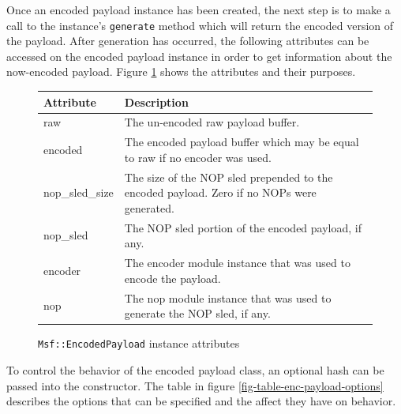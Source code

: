 \documentclass{report}
\begin{document}
\par
Once an encoded payload instance has been created, the next step is
to make a call to the instance's \texttt{generate} method which will
return the encoded version of the payload.  After generation has
occurred, the following attributes can be accessed on the encoded
payload instance in order to get information about the now-encoded
payload.  Figure \ref{fig-table-enc-payload} shows the attributes
and their purposes.

\begin{figure}[h]
\begin{center}
\begin{tabular}{|l|p{3.5in}|}
\hline
\textbf{Attribute} & \textbf{Description} \\
\hline
raw & The un-encoded raw payload buffer. \\
\hline
encoded & The encoded payload buffer which may be equal to raw if no encoder was used. \\
\hline
nop\_sled\_size & The size of the NOP sled prepended to the encoded payload.  Zero if no NOPs were generated. \\
\hline
nop\_sled & The NOP sled portion of the encoded payload, if any. \\
\hline encoder & The encoder module instance that was used to encode
the
payload. \\
\hline nop & The nop module instance that was used to generate the
NOP
sled, if any. \\
\hline
\end{tabular}
\caption{\texttt{Msf::EncodedPayload} instance attributes}
\label{fig-table-enc-payload}
\end{center}
\end{figure}

\par
To control the behavior of the encoded payload class, an optional
hash can be passed into the constructor.  The table in figure
\ref{fig-table-enc-payload-options} describes the options that can
be specified and the affect they have on behavior.
\end{document}
